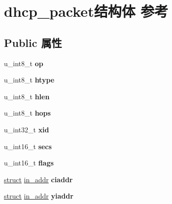 \hypertarget{structdhcp__packet}{}\section{dhcp\+\_\+packet结构体 参考}
\label{structdhcp__packet}
\subsection*{Public 属性}
\begin{DoxyCompactItemize}
\item 
\mbox{\label{structdhcp__packet_a7db3f6e11e757dfe5e18fea3ce9f366e}} 
u\+\_\+int8\+\_\+t {\bfseries op}
\item 
\mbox{\label{structdhcp__packet_a8f68da986d07cf0845fbb836db06f876}} 
u\+\_\+int8\+\_\+t {\bfseries htype}
\item 
\mbox{\label{structdhcp__packet_aeecbb5e0ef54fc76eb4988c6cbe6f02b}} 
u\+\_\+int8\+\_\+t {\bfseries hlen}
\item 
\mbox{\label{structdhcp__packet_af8e55856c9c3baa0d6c0ff0821eb1620}} 
u\+\_\+int8\+\_\+t {\bfseries hops}
\item 
\mbox{\label{structdhcp__packet_a17744645e83ec570b9070a67e21c65b8}} 
u\+\_\+int32\+\_\+t {\bfseries xid}
\item 
\mbox{\label{structdhcp__packet_ac9f92281b5cdca7d1108a2475acb2036}} 
u\+\_\+int16\+\_\+t {\bfseries secs}
\item 
\mbox{\label{structdhcp__packet_a07ae5afabde608602c388bf3891ac1b6}} 
u\+\_\+int16\+\_\+t {\bfseries flags}
\item 
\mbox{\label{structdhcp__packet_a1e6e8e0bae45f385e98ac82cb4cf802d}} 
\hyperlink{interfacestruct}{struct} \hyperlink{structin__addr}{in\+\_\+addr} {\bfseries ciaddr}
\item 
\mbox{\label{structdhcp__packet_abafbd04025028a1b0a1647615908d9ec}} 
\hyperlink{interfacestruct}{struct} \hyperlink{structin__addr}{in\+\_\+addr} {\bfseries yiaddr}

\end{DoxyCompactItemize}
